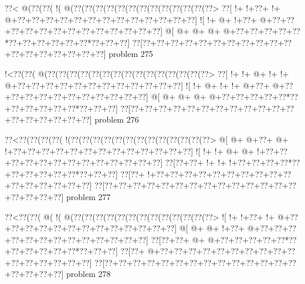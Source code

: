 \vbox{\vbox{\goo
\0??<\- @(\0??(\0??(\- !(\- @(\0??(\0??(\0??(\0??(\0??(\0??(\0??(\0??(\0??(\0??(\0??(\0??(\0??>
\0??[\- !+\- !+\0??+\- !+\- @+\0??+\0??+\0??+\0??+\0??+\0??+\0??+\0??+\0??+\0??+\0??+\0??+\0??]
\- ![\- !+\- @+\- !+\0??+\- @+\0??+\0??+\0??+\0??+\0??+\0??+\0??+\0??+\0??+\0??+\0??+\0??+\0??]
\- @[\- @+\- @+\- @+\- @+\0??+\0??+\0??+\0??+\0??*\0??+\0??+\0??+\0??+\0??+\0??*\0??+\0??+\0??]
\0??[\0??+\0??+\0??+\0??+\0??+\0??+\0??+\0??+\0??+\0??+\0??+\0??+\0??+\0??+\0??+\0??+\0??+\0??]
}
\hfil problem 275\hfil\break
}



\vbox{\vbox{\goo
\- !<\0??(\0??(\- @(\0??(\0??(\0??(\0??(\0??(\0??(\0??(\0??(\0??(\0??(\0??(\0??(\0??(\0??(\0??>
\0??[\- !+\- !+\- @+\- !+\- !+\- @+\0??+\0??+\0??+\0??+\0??+\0??+\0??+\0??+\0??+\0??+\0??+\0??]
\- ![\- !+\- @+\- !+\- !+\- @+\0??+\- @+\0??+\0??+\0??+\0??+\0??+\0??+\0??+\0??+\0??+\0??+\0??]
\- @[\- @+\- @+\- @+\- @+\0??+\0??+\0??+\0??+\0??*\0??+\0??+\0??+\0??+\0??+\0??*\0??+\0??+\0??]
\0??[\0??+\0??+\0??+\0??+\0??+\0??+\0??+\0??+\0??+\0??+\0??+\0??+\0??+\0??+\0??+\0??+\0??+\0??]
}
\hfil problem 276\hfil\break
}



\vbox{\vbox{\goo
\0??<\0??(\0??(\0??(\0??(\- !(\0??(\0??(\0??(\0??(\0??(\0??(\0??(\0??(\0??(\0??(\0??(\0??(\0??>
\- @[\- @+\- @+\0??+\- @+\- !+\0??+\0??+\0??+\0??+\0??+\0??+\0??+\0??+\0??+\0??+\0??+\0??+\0??]
\- ![\- !+\- !+\- @+\- @+\- !+\0??+\0??+\0??+\0??+\0??+\0??+\0??+\0??+\0??+\0??+\0??+\0??+\0??]
\0??[\0??+\0??+\- !+\- !+\- !+\0??+\0??+\0??+\0??*\0??+\0??+\0??+\0??+\0??+\0??*\0??+\0??+\0??]
\0??[\0??+\- !+\0??+\0??+\0??+\0??+\0??+\0??+\0??+\0??+\0??+\0??+\0??+\0??+\0??+\0??+\0??+\0??]
\0??[\0??+\0??+\0??+\0??+\0??+\0??+\0??+\0??+\0??+\0??+\0??+\0??+\0??+\0??+\0??+\0??+\0??+\0??]
}
\hfil problem 277\hfil\break
}



\vbox{\vbox{\goo
\0??<\0??(\0??(\- @(\- !(\- @(\0??(\0??(\0??(\0??(\0??(\0??(\0??(\0??(\0??(\0??(\0??(\0??(\0??>
\- ![\- !+\- !+\0??+\- !+\- @+\0??+\0??+\0??+\0??+\0??+\0??+\0??+\0??+\0??+\0??+\0??+\0??+\0??]
\- @[\- @+\- @+\- !+\0??+\- @+\0??+\0??+\0??+\0??+\0??+\0??+\0??+\0??+\0??+\0??+\0??+\0??+\0??]
\0??[\0??+\0??+\- @+\- @+\0??+\0??+\0??+\0??+\0??*\0??+\0??+\0??+\0??+\0??+\0??*\0??+\0??+\0??]
\0??[\0??+\- @+\0??+\0??+\0??+\0??+\0??+\0??+\0??+\0??+\0??+\0??+\0??+\0??+\0??+\0??+\0??+\0??]
\0??[\0??+\0??+\0??+\0??+\0??+\0??+\0??+\0??+\0??+\0??+\0??+\0??+\0??+\0??+\0??+\0??+\0??+\0??]
}
\hfil problem 278\hfil\break
}



